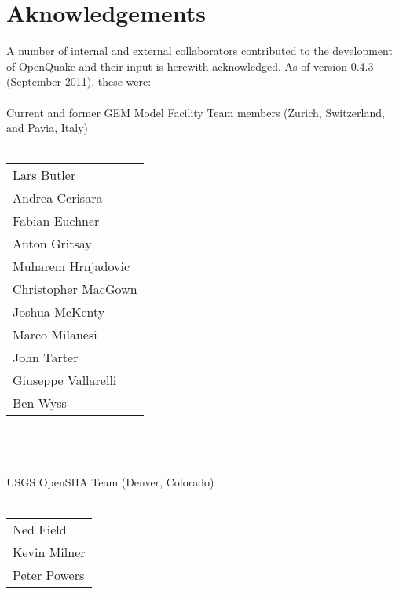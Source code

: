 \chapter*{Aknowledgements}
A number of internal and external collaborators contributed to 
the development of OpenQuake and their input is herewith acknowledged. 
As of version 0.4.3 (September 2011), these were: \hfill \\
\hfill \\
Current and former GEM Model Facility Team members (Zurich, Switzerland,
and Pavia, Italy) \hfill \\
\hfill \\
\begin{tabular}{l}
Lars Butler \\
Andrea Cerisara \\
Fabian Euchner \\
Anton Gritsay \\
Muharem Hrnjadovic \\
Christopher MacGown \\
Joshua McKenty \\
Marco Milanesi \\
John Tarter \\
Giuseppe Vallarelli \\
Ben Wyss \\
\end{tabular} \hfill \\
%
\hfill \\
\hfill \\
USGS OpenSHA Team (Denver, Colorado) \hfill \\
\hfill \\
\begin{tabular}{l}
Ned Field \\
Kevin Milner \\
Peter Powers \\
\end{tabular}

